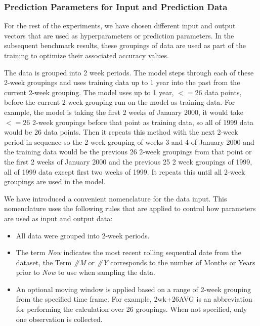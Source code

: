 \documentclass[utf8]{FrontiersinVancouver} %
\begin{document}
\subsubsection{Prediction Parameters for Input and Prediction Data}

For the rest of the experiments, we have chosen different input and output vectors that are used as hyperparameters or prediction parameters. In the subsequent benchmark results, these groupings of data are used as part of the training to optimize their associated accuracy values. 

The data is grouped into 2 week periods. The model steps through each of these 2-week groupings and uses training data up to 1 year into the past from the current 2-week grouping. The model uses up to 1 year, $<=26$ data points, before the current 2-week grouping run on the model as training data. For example, the model is taking the first 2 weeks of January 2000, it would take $<=26$ 2-week groupings before that point as training data, so all of 1999 data would be 26 data points. Then it repeats this method with the next 2-week period in sequence so the 2-week grouping of weeks 3 and 4 of January 2000 and the training data would be the previous 26 2-week groupings from that point or the first 2 weeks of January 2000 and the previous 25 2 week groupings of 1999, all of 1999 data except first two weeks of 1999. It repeats this until all 2-week groupings are used in the model.

We have introduced a convenient nomenclature for the data input. This nomenclature uses the following rules that are applied to control how parameters are used as input and output data:

\begin{itemize}
  \item All data were grouped into 2-week periods.
  \item The term {\em Now} indicates the most recent rolling sequential date from the dataset, the Term {\em \#M} or {\em \#Y}    corresponds to the number of Months or Years prior to {\em Now} to use when sampling the data.
  \item An optional moving window is applied based on a range of    2-week grouping from the specified time frame.  For example,    2wk+26AVG is an abbreviation for performing the calculation over    26 groupings.  When not specified, only one observation is collected.
\end{itemize}
\end{document}
